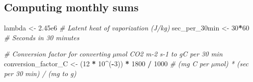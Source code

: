 \documentclass[
]{article}
\newenvironment{Shaded}{\begin{snugshade}}{\end{snugshade}}
\newcommand{\CommentTok}[1]{\textcolor[rgb]{0.56,0.35,0.01}{\textit{#1}}}
\newcommand{\DecValTok}[1]{\textcolor[rgb]{0.00,0.00,0.81}{#1}}
\newcommand{\FloatTok}[1]{\textcolor[rgb]{0.00,0.00,0.81}{#1}}
\newcommand{\NormalTok}[1]{#1}
\newcommand{\OtherTok}[1]{\textcolor[rgb]{0.56,0.35,0.01}{#1}}
\newcommand{\SpecialCharTok}[1]{\textcolor[rgb]{0.81,0.36,0.00}{\textbf{#1}}}
\begin{document}
\subsection{Computing monthly sums}\label{computing-monthly-sums}

\begin{Shaded}
\begin{Highlighting}[]
\NormalTok{lambda }\OtherTok{\textless{}{-}} \FloatTok{2.45e6}  \CommentTok{\# Latent heat of vaporization (J/kg)}
\NormalTok{sec\_per\_30min }\OtherTok{\textless{}{-}} \DecValTok{30}\SpecialCharTok{*}\DecValTok{60}  \CommentTok{\# Seconds in 30 minutes}

\CommentTok{\# Conversion factor for converting µmol CO2 m{-}2 s{-}1 to gC per 30 min}
\NormalTok{conversion\_factor\_C }\OtherTok{\textless{}{-}}\NormalTok{ (}\DecValTok{12} \SpecialCharTok{*} \DecValTok{10}\SpecialCharTok{\^{}}\NormalTok{(}\SpecialCharTok{{-}}\DecValTok{3}\NormalTok{)) }\SpecialCharTok{*} \DecValTok{1800} \SpecialCharTok{/} \DecValTok{1000}  \CommentTok{\# (mg C per µmol) * (sec per 30 min) / (mg to g)}



\end{Highlighting}
\end{Shaded}
\end{document}
